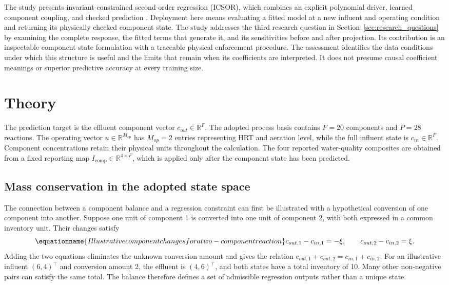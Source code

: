 The study presents invariant-constrained second-order regression (ICSOR), which combines an explicit polynomial driver, learned component coupling, and checked prediction \citep{Selerio2026}. Deployment here means evaluating a fitted model at a new influent and operating condition and returning its physically checked component state. The study addresses the third research question in Section~\ref{sec:research_questions} by examining the complete response, the fitted terms that generate it, and its sensitivities before and after projection. Its contribution is an inspectable component-state formulation with a traceable physical enforcement procedure. The assessment identifies the data conditions under which this structure is useful and the limits that remain when its coefficients are interpreted. It does not presume causal coefficient meanings or superior predictive accuracy at every training size.

\section{Theory}

The prediction target is the effluent component vector \(c_{out}\in\mathbb{R}^{F}\). The adopted process basis contains \(F=20\) components and \(P=28\) reactions. The operating vector \(u\in\mathbb{R}^{M_{op}}\) has \(M_{op}=2\) entries representing HRT and aeration level, while the full influent state is \(c_{in}\in\mathbb{R}^{F}\). Component concentrations retain their physical units throughout the calculation. The four reported water-quality composites are obtained from a fixed reporting map \(I_{\mathrm{comp}}\in\mathbb{R}^{4\times F}\), which is applied only after the component state has been predicted.

\subsection{Mass conservation in the adopted state space}

The connection between a component balance and a regression constraint can first be illustrated with a hypothetical conversion of one component into another. Suppose one unit of component 1 is converted into one unit of component 2, with both expressed in a common inventory unit. Their changes satisfy
\begin{equation}
\equationname{Illustrative component changes for a two-component reaction}
\label{eq:icsor_scalar_inventory_example}
c_{out,1}-c_{in,1}=-\xi,
\qquad
c_{out,2}-c_{in,2}=\xi.
\end{equation}
Adding the two equations eliminates the unknown conversion amount and gives the relation \(c_{out,1}+c_{out,2}=c_{in,1}+c_{in,2}\). For an illustrative influent \((6,4)^\top\) and conversion amount 2, the effluent is \((4,6)^\top\), and both states have a total inventory of 10. Many other non-negative pairs can satisfy the same total. The balance therefore defines a set of admissible regression outputs rather than a unique state.

